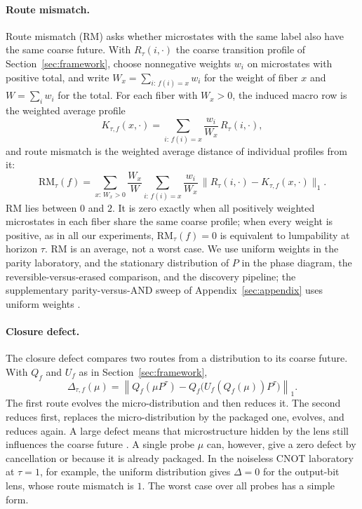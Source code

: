 \paragraph{Route mismatch.} Route mismatch (RM) asks whether microstates with the same label also have the same coarse future. With \(R_\tau(i,\cdot)\) the coarse transition profile of Section~\ref{sec:framework}, choose nonnegative weights \(w_i\) on microstates with positive total, and write \(W_x=\sum_{i:\,f(i)=x} w_i\) for the weight of fiber \(x\) and \(W=\sum_i w_i\) for the total. For each fiber with \(W_x>0\), the induced macro row is the weighted average profile
\[
K_{\tau,f}(x,\cdot)
=
\sum_{i:\,f(i)=x} \frac{w_i}{W_x}\, R_\tau(i,\cdot),
\]
and route mismatch is the weighted average distance of individual profiles from it:
\[
\mathrm{RM}_\tau(f)
=
\sum_{x:\,W_x>0} \frac{W_x}{W}
\sum_{i:\,f(i)=x}
\frac{w_i}{W_x}\,
\bigl\|
R_\tau(i,\cdot)-K_{\tau,f}(x,\cdot)
\bigr\|_1 .
\]
RM lies between \(0\) and \(2\). It is zero exactly when all positively weighted microstates in each fiber share the same coarse profile; when every weight is positive, as in all our experiments, \(\mathrm{RM}_\tau(f)=0\) is equivalent to lumpability at horizon \(\tau\). RM is an average, not a worst case. We use uniform weights in the parity laboratory, and the stationary distribution of \(P\) in the phase diagram, the reversible-versus-erased comparison, and the discovery pipeline; the supplementary parity-versus-AND sweep of Appendix~\ref{sec:appendix} uses uniform weights \cite{kemeny1976finite,buchholz1994lumpability,simonando1961aggregation}.

\paragraph{Closure defect.} The closure defect compares two routes from a distribution to its coarse future. With \(Q_f\) and \(U_f\) as in Section~\ref{sec:framework},
\[
\Delta_{\tau,f}(\mu)
=
\left\|
Q_f(\mu P^\tau)
-
Q_f\!\bigl(U_f(Q_f(\mu))P^\tau\bigr)
\right\|_1 .
\]
The first route evolves the micro-distribution and then reduces it. The second reduces first, replaces the micro-distribution by the packaged one, evolves, and reduces again. A large defect means that microstructure hidden by the lens still influences the coarse future \cite{givon2004extracting,shalizi2025macrostate,barnettseth2023dynamical}. A single probe \(\mu\) can, however, give a zero defect by cancellation or because it is already packaged. In the noiseless CNOT laboratory at \(\tau=1\), for example, the uniform distribution gives \(\Delta=0\) for the output-bit lens, whose route mismatch is \(1\). The worst case over all probes has a simple form.

